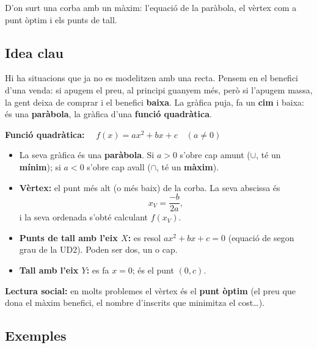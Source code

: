 %
{D'on surt una corba amb un màxim: l'equació de la paràbola, el vèrtex com a punt òptim i els punts de tall.}

\subsection{Idea clau}

Hi ha situacions que ja no es modelitzen amb una recta. Pensem en el benefici d'una
venda: si apugem el preu, al principi guanyem més, però si l'apugem massa, la gent
deixa de comprar i el benefici \textbf{baixa}. La gràfica puja, fa un \textbf{cim} i
baixa: és una \textbf{paràbola}, la gràfica d'una \textbf{funció quadràtica}.

\begin{idea}
\textbf{Funció quadràtica:} $\quad f(x)=ax^2+bx+c \quad (a\neq 0)$
\begin{itemize}[leftmargin=1.4em, itemsep=2pt]
  \item La seva gràfica és una \textbf{paràbola}. Si $a>0$ s'obre cap amunt
        ($\cup$, té un \textbf{mínim}); si $a<0$ s'obre cap avall
        ($\cap$, té un \textbf{màxim}).
  \item \textbf{Vèrtex:} el punt més alt (o més baix) de la corba. La seva abscissa és
        \[
        x_V=\frac{-b}{2a},
        \]
        i la seva ordenada s'obté calculant $f(x_V)$.
  \item \textbf{Punts de tall amb l'eix $X$:} es resol $ax^2+bx+c=0$ (equació de segon
        grau de la UD2). Poden ser dos, un o cap.
  \item \textbf{Tall amb l'eix $Y$:} es fa $x=0$; és el punt $(0,c)$.
\end{itemize}
\textbf{Lectura social:} en molts problemes el vèrtex és el \textbf{punt òptim} (el
preu que dona el màxim benefici, el nombre d'inscrits que minimitza el cost…).
\end{idea}

\subsection{Exemples}

